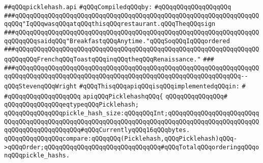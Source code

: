 \label{src/lib/compiler/front/basics/map/picklehash.api}
\verb|##qQQqpicklehash.api|\newline
\newline
\verb|#qQQqCompiledqQQqby:|\newline
\verb|#qQQqqQQqqQQqqQQqqQQq|\newline
\newline
\newline
\newline
\verb|###qQQqqQQqqQQqqQQqqQQqqQQqqQQqqQQqqQQqqQQqqQQqqQQqqQQqqQQqqQQqqQQqqQQqqQQq"IqQQqwasqQQqatqQQqthisqQQqrestaurant.qQQqTheqQQqsign|\newline
\verb|###qQQqqQQqqQQqqQQqqQQqqQQqqQQqqQQqqQQqqQQqqQQqqQQqqQQqqQQqqQQqqQQqqQQqqQQqqQQqsaidqQQq"BreakfastqQQqAnytime."qQQqSoqQQqIqQQqordered|\newline
\verb|###qQQqqQQqqQQqqQQqqQQqqQQqqQQqqQQqqQQqqQQqqQQqqQQqqQQqqQQqqQQqqQQqqQQqqQQqqQQqFrenchqQQqToastqQQqinqQQqtheqQQqRenaissance."|\newline
\verb|###|\newline
\verb|###qQQqqQQqqQQqqQQqqQQqqQQqqQQqqQQqqQQqqQQqqQQqqQQqqQQqqQQqqQQqqQQqqQQqqQQqqQQqqQQqqQQqqQQqqQQqqQQqqQQqqQQqqQQqqQQqqQQqqQQqqQQqqQQqqQQq--qQQqStevenqQQqWright|\newline
\newline
\newline
\newline
\verb|#qQQqThisqQQqapiqQQqisqQQqimplementedqQQqin:|\newline
\verb|#|\newline
\verb|#qQQqqQQqqQQqqQQqqQQq|\newline
\newline
\verb|apiqQQqPicklehashqQQq{|\newline
\verb|qQQqqQQqqQQqqQQq#|\newline
\verb|qQQqqQQqqQQqqQQqeqtypeqQQqPicklehash;|\newline
\newline
\verb|qQQqqQQqqQQqqQQqpickle_hash_size:qQQqqQQqInt;qQQqqQQqqQQqqQQqqQQqqQQqqQQqqQQqqQQqqQQqqQQqqQQqqQQqqQQqqQQqqQQqqQQqqQQqqQQqqQQqqQQqqQQqqQQqqQQqqQQqqQQqqQQqqQQqqQQq#qQQqCurrentlyqQQq16qQQqbytes.|\newline
\newline
\verb|qQQqqQQqqQQqqQQqcompare:qQQqqQQq(Picklehash,qQQqPicklehash)qQQq->qQQqOrder;qQQqqQQqqQQqqQQqqQQqqQQqqQQqqQQq#qQQqTotalqQQqorderingqQQqonqQQqpickle_hashs.|\newline

